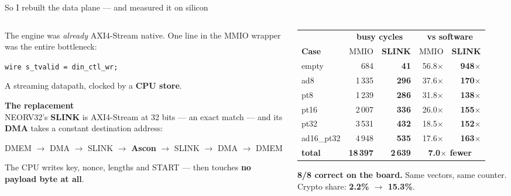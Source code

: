 \documentclass[aspectratio=169,11pt]{beamer}
\newcommand{\code}[1]{\texttt{\small #1}}
\begin{document}
\begin{frame}{So I rebuilt the data plane --- and measured it on silicon}
\begin{columns}[T]
\begin{column}{0.44\textwidth}
{\small The engine was \emph{already} AXI4-Stream native. One line in the MMIO
wrapper was the entire bottleneck:}
\vspace{1mm}

{\scriptsize\code{wire s\_tvalid = din\_ctl\_wr;}}

{\footnotesize A streaming datapath, clocked by a \textbf{CPU store}.}
\vspace{1.5mm}

{\small\color{docblue}\textbf{The replacement}}\\
{\footnotesize NEORV32's \textbf{SLINK} is AXI4-Stream at 32 bits --- an exact
match --- and its \textbf{DMA} takes a constant destination address:}

{\scriptsize DMEM $\rightarrow$ DMA $\rightarrow$ SLINK $\rightarrow$
\textbf{Ascon} $\rightarrow$ SLINK $\rightarrow$ DMA $\rightarrow$ DMEM}
\vspace{1mm}

{\footnotesize The CPU writes key, nonce, lengths and START --- then touches
\textbf{no payload byte at all}.}
\end{column}
\begin{column}{0.56\textwidth}
\vspace{-2mm}
\centering
{\scriptsize\setlength{\tabcolsep}{4pt}\renewcommand{\arraystretch}{1.05}
\begin{tabular}{lrrrr}
\toprule
& \multicolumn{2}{c}{\textbf{busy cycles}} & \multicolumn{2}{c}{\textbf{vs software}}\\
\cmidrule(lr){2-3}\cmidrule(lr){4-5}
\textbf{Case} & MMIO & \textbf{SLINK} & MMIO & \textbf{SLINK}\\
\midrule
empty      &   684 &  \textbf{41} & 56.8$\times$ & \textbf{948$\times$}\\
ad8        & 1\,335 & \textbf{296} & 37.6$\times$ & \textbf{170$\times$}\\
pt8        & 1\,239 & \textbf{286} & 31.8$\times$ & \textbf{138$\times$}\\
pt16       & 2\,007 & \textbf{336} & 26.0$\times$ & \textbf{155$\times$}\\
pt32       & 3\,531 & \textbf{432} & 18.5$\times$ & \textbf{152$\times$}\\
\rowcolor{hwfill}
ad16\_pt32 & 4\,948 & \textbf{535} & 17.6$\times$ & \textbf{163$\times$}\\
\midrule
\textbf{total} & \textbf{18\,397} & \textbf{2\,639} & \multicolumn{2}{c}{\textbf{7.0$\times$ fewer}}\\
\bottomrule
\end{tabular}}
\vspace{2mm}

{\footnotesize \textbf{8/8 correct on the board.} Same vectors, same counter.
Crypto share: \textbf{2.2\% $\rightarrow$ 15.3\%}.}
\end{column}
\end{columns}
\end{frame}
\end{document}
